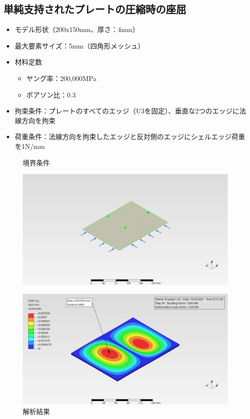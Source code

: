 \documentclass[a4j,20pt,slide]{ltjsarticle}
\begin{document}
\subsection{単純支持されたプレートの圧縮時の座屈}
\begin{itemize}
	\item モデル形状（200x150mm、厚さ：4mm）
	\item 最大要素サイズ：5mm（四角形メッシュ）
	\item 材料定数
	      \begin{itemize}
		      \item ヤング率：200,000MPa
		      \item ポアソン比：0.3
	      \end{itemize}
	\item 拘束条件：プレートのすべてのエッジ（U3を固定）、垂直な2つのエッジに法線方向を拘束
	\item 荷重条件：法線方向を拘束したエッジと反対側のエッジにシェルエッジ荷重を1N/mm
\end{itemize}
\vspace{-\baselineskip}
\begin{figure}[H]
	\begin{minipage}{.49\hsize}
		\caption{境界条件}
		\label{10-01}
		\centering
		\includegraphics[width=.95\columnwidth]{fig/10-01.png}
	\end{minipage}
	\begin{minipage}{.49\hsize}
		\caption{解析結果}
		\label{10-02}
		\centering
		\includegraphics[width=.95\columnwidth]{fig/10-02.png}
	\end{minipage}
\end{figure}
\clearpage
%
\end{document}
